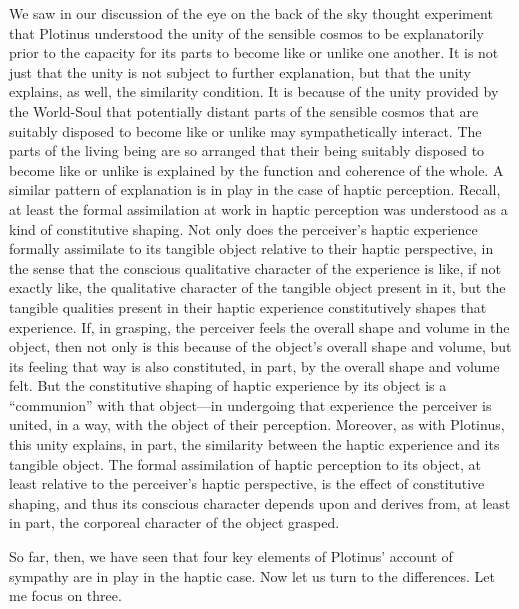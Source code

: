 We saw in our discussion of the eye on the back of the sky thought experiment that Plotinus understood the unity of the sensible cosmos to be explanatorily prior to the capacity for its parts to become like or unlike one another. It is not just that the unity is not subject to further explanation, but that the unity explains, as well, the similarity condition. It is because of the unity provided by the World-Soul that potentially distant parts of the sensible cosmos that are suitably disposed to become like or unlike may sympathetically interact. The parts of the living being are so arranged that their being suitably disposed to become like or unlike is explained by the function and coherence of the whole. A similar pattern of explanation is in play in the case of haptic perception. Recall, at least the formal assimilation at work in haptic perception was understood as a kind of constitutive shaping. Not only does the perceiver's haptic experience formally assimilate to its tangible object relative to their haptic perspective, in the sense that the conscious qualitative character of the experience is like, if not exactly like, the qualitative character of the tangible object present in it, but the tangible qualities present in their haptic experience constitutively shapes that experience. If, in grasping, the perceiver feels the overall shape and volume in the object, then not only is this because of the object's overall shape and volume, but its feeling that way is also constituted, in part, by the overall shape and volume felt. But the constitutive shaping of haptic experience by its object is a ``communion'' with that object---in undergoing that experience the perceiver is united, in a way, with the object of their perception. Moreover, as with Plotinus, this unity explains, in part, the similarity between the haptic experience and its tangible object. The formal assimilation of haptic perception to its object, at least relative to the perceiver's haptic perspective, is the effect of constitutive shaping, and thus its conscious character depends upon and derives from, at least in part, the corporeal character of the object grasped.

So far, then, we have seen that four key elements of Plotinus' account of sympathy are in play in the haptic case. Now let us turn to the differences. Let me focus on three. 

